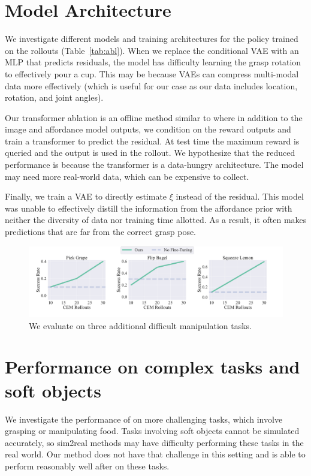 \section{Model Architecture} We investigate different models and training architectures for the policy trained on the rollouts (Table~\ref{tab:abl}). When we replace the conditional VAE with an MLP that predicts residuals, the model has difficulty learning the grasp rotation to effectively pour a cup. This may be because VAEs can compress multi-modal data more effectively (which is useful for our case as our data includes location, rotation, and joint angles).

Our transformer ablation is an offline method similar to \cite{chen2021decisiontransformer} where in addition to the image and affordance model outputs, we condition on the reward outputs and train a transformer to predict the residual. At test time the maximum reward is queried and the output is used in the rollout. We hypothesize that the reduced performance is because the transformer is a data-hungry architecture. The model may need more real-world data, which can be expensive to collect.

Finally, we train a VAE to directly estimate $\xi$ instead of the residual. This model was unable to effectively distill the information from the affordance prior with neither the diversity of data nor training time allotted. As a result, it often makes predictions that are far from the correct grasp pose. 


\begin{figure}[t]
\vspace{-0.2in}
\begin{center}
    \includegraphics[width=\linewidth]{figs/graphs_difficult.pdf}
\end{center}
\vspace{-0.1in}
  \caption{\footnotesize We evaluate \ours on three additional difficult manipulation tasks. }
 \label{fig:graph_difficult}
 \vspace{-0.15in}
\end{figure}


\section{Performance on complex tasks and soft objects} 
We investigate the performance of \ours on more challenging tasks, which involve grasping or manipulating food. Tasks involving soft objects cannot be simulated accurately, so sim2real methods may have difficulty performing these tasks in the real world. Our method does not have that challenge in this setting and \ours is able to perform reasonably well after on these tasks.

